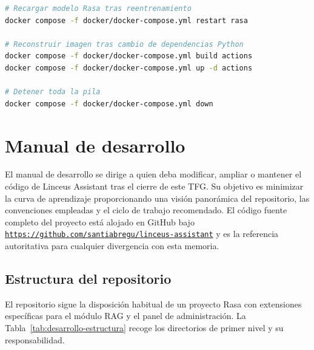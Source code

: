 \begin{lstlisting}[language=bash, caption={Operaciones de mantenimiento habituales.}]
# Recargar modelo Rasa tras reentrenamiento
docker compose -f docker/docker-compose.yml restart rasa

# Reconstruir imagen tras cambio de dependencias Python
docker compose -f docker/docker-compose.yml build actions
docker compose -f docker/docker-compose.yml up -d actions

# Detener toda la pila
docker compose -f docker/docker-compose.yml down
\end{lstlisting}

\section{Manual de desarrollo}\label{sec:manual-desarrollo}

El manual de desarrollo se dirige a quien deba modificar, ampliar o mantener el código de Linceus Assistant tras el cierre de este TFG. Su objetivo es minimizar la curva de aprendizaje proporcionando una visión panorámica del repositorio, las convenciones empleadas y el ciclo de trabajo recomendado. El código fuente completo del proyecto está alojado en GitHub bajo \href{https://github.com/santiabregu/linceus-assistant}{\texttt{https://github.com/santiabregu/linceus-assistant}} y es la referencia autoritativa para cualquier divergencia con esta memoria.

\subsection{Estructura del repositorio}\label{subsec:desarrollo-estructura}

El repositorio sigue la disposición habitual de un proyecto Rasa con extensiones específicas para el módulo RAG y el panel de administración. La Tabla~\ref{tab:desarrollo-estructura} recoge los directorios de primer nivel y su responsabilidad.

